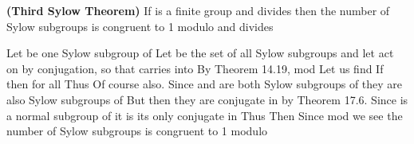 \documentclass[11pt,oneside]{article}
\begin{document}
\begin{BookBody}
 \textbf{(Third Sylow Theorem)} If  is a finite group and  divides  then the number of Sylow subgroups is congruent to 1 modulo  and divides 

 Let  be one Sylow subgroup of  Let  be the set of all Sylow subgroups and let  act on  by conjugation, so that  carries  into  By Theorem 14.19, mod  Let us find  If  then  for all  Thus  Of course also. Since  and  are both Sylow subgroups of  
they are also Sylow subgroups of  But then they are conjugate in  by Theorem 17.6. Since  is a normal subgroup of  it is its only conjugate in  Thus  Then  Since mod  we see the number of Sylow subgroups is congruent to 1 modulo 

\end{BookBody}

\BookNarrativetrue
\end{document}
